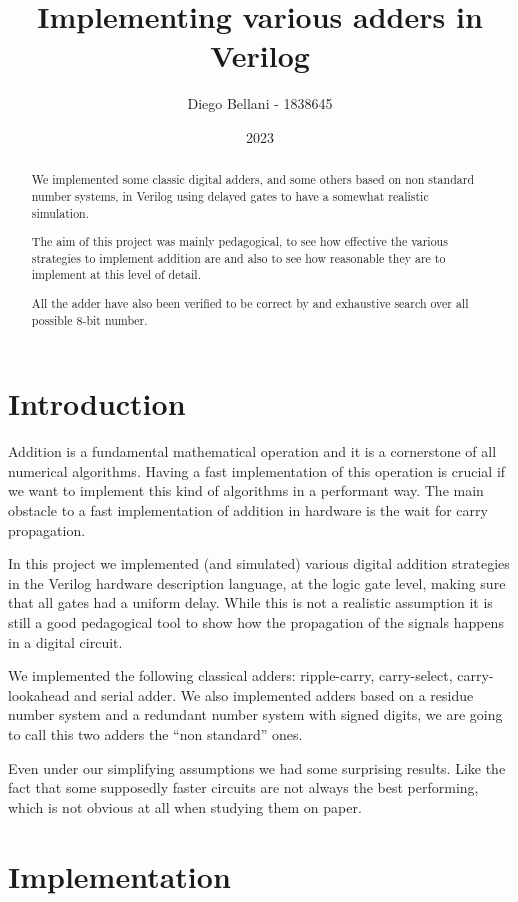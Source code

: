 \documentclass{article}
\title{Implementing various adders in Verilog}
\author{Diego Bellani - 1838645}
\date{2023}
\begin{document}
\maketitle

\begin{abstract}
We implemented some classic digital adders, and some others based on non
standard number systems, in Verilog using delayed gates to have a somewhat
realistic simulation.

The aim of this project was mainly pedagogical, to see how effective the various
strategies to implement addition are and also to see how reasonable they are to
implement at this level of detail.

All the adder have also been verified to be correct by and exhaustive search
over all possible 8-bit number.
\end{abstract}

\section{Introduction}

Addition is a fundamental mathematical operation and it is a cornerstone of all
numerical algorithms. Having a fast implementation of this operation is crucial
if we want to implement this kind of algorithms in a performant way. The main
obstacle to a fast implementation of addition in hardware is the wait for carry
propagation.

In this project we implemented (and simulated) various digital addition
strategies in the Verilog hardware description language, at the logic gate
level, making sure that all gates had a uniform delay. While this is not a
realistic assumption it is still a good pedagogical tool to show how the
propagation of the signals happens in a digital circuit.

We implemented the following classical adders: ripple-carry, carry-select,
carry-lookahead and serial adder. We also implemented adders based on a residue
number system and a redundant number system with signed digits, we are going to
call this two adders the ``non standard'' ones.

Even under our simplifying assumptions we had some surprising results. Like the
fact that some supposedly faster circuits are not always the best performing,
which is not obvious at all when studying them on paper.

\section{Implementation}
\end{document}
